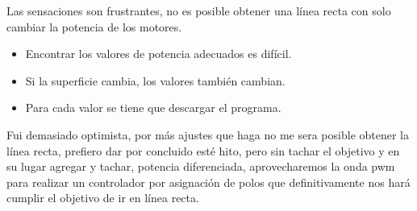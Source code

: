 Las sensaciones son frustrantes, no es posible obtener una línea recta con solo 
cambiar la potencia de los motores.
\begin{itemize}
	\item Encontrar los valores de potencia adecuados es difícil.
	\item Si la superficie cambia, los valores también cambian.
	\item Para cada valor se tiene que descargar el programa.
\end{itemize}

Fui demasiado optimista, por más ajustes que haga no me sera posible obtener la
línea recta, prefiero dar por concluido esté hito, pero sin tachar el objetivo y
en su lugar agregar y tachar, potencia diferenciada, aprovecharemos la onda pwm 
para realizar un controlador por asignación de polos que definitivamente nos
hará cumplir el objetivo de ir en línea recta.

